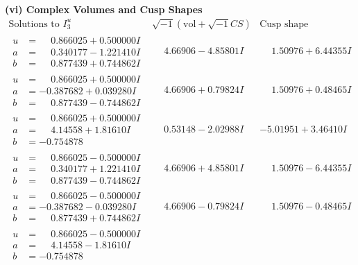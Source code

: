 \documentclass[1p]{elsarticle_modified}
\theoremstyle{definition}
\newcommand{\I}{\sqrt{-1}}
\begin{document}
\newpage\flushleft \textbf{(vi) Complex Volumes and Cusp Shapes}
$$\begin{array}{c|c|c}  
\text{Solutions to }I^u_{3}& \I (\text{vol} + \sqrt{-1}CS) & \text{Cusp shape}\\
 \hline 
\begin{aligned}
u &= \phantom{-}0.866025 + 0.500000 I \\
a &= \phantom{-}0.340177 - 1.221410 I \\
b &= \phantom{-}0.877439 + 0.744862 I\end{aligned}
 & \phantom{-}4.66906 - 4.85801 I & \phantom{-}1.50976 + 6.44355 I \\ \hline\begin{aligned}
u &= \phantom{-}0.866025 + 0.500000 I \\
a &= -0.387682 + 0.039280 I \\
b &= \phantom{-}0.877439 - 0.744862 I\end{aligned}
 & \phantom{-}4.66906 + 0.79824 I & \phantom{-}1.50976 + 0.48465 I \\ \hline\begin{aligned}
u &= \phantom{-}0.866025 + 0.500000 I \\
a &= \phantom{-}4.14558 + 1.81610 I \\
b &= -0.754878\phantom{ +0.000000I}\end{aligned}
 & \phantom{-}0.53148 - 2.02988 I & -5.01951 + 3.46410 I \\ \hline\begin{aligned}
u &= \phantom{-}0.866025 - 0.500000 I \\
a &= \phantom{-}0.340177 + 1.221410 I \\
b &= \phantom{-}0.877439 - 0.744862 I\end{aligned}
 & \phantom{-}4.66906 + 4.85801 I & \phantom{-}1.50976 - 6.44355 I \\ \hline\begin{aligned}
u &= \phantom{-}0.866025 - 0.500000 I \\
a &= -0.387682 - 0.039280 I \\
b &= \phantom{-}0.877439 + 0.744862 I\end{aligned}
 & \phantom{-}4.66906 - 0.79824 I & \phantom{-}1.50976 - 0.48465 I \\ \hline\begin{aligned}
u &= \phantom{-}0.866025 - 0.500000 I \\
a &= \phantom{-}4.14558 - 1.81610 I \\
b &= -0.754878\phantom{ +0.000000I}\end{aligned}

\end{array}$$
\end{document}
